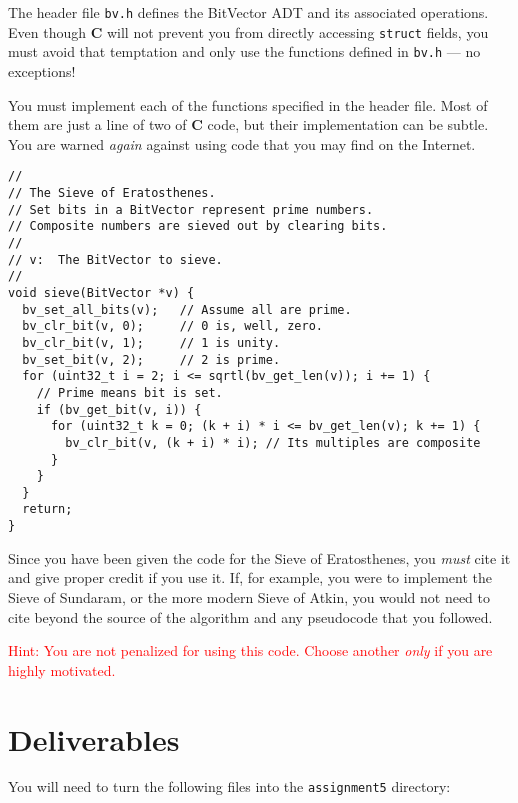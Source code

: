\documentclass{article}
\begin{document}
The header file \texttt{bv.h} defines the BitVector ADT and its associated
operations. Even though \textbf{C} will not prevent you from directly accessing
\texttt{struct} fields, you must avoid that temptation and only use the functions defined
in \texttt{bv.h} --- no exceptions!

You must implement each of the functions specified in the header
file. Most of them are just a line of two of \textbf{C} code, but
their implementation can be subtle. You are warned \emph{again}
against using code that you may find on the Internet.


\begin{lstlisting}
//
// The Sieve of Eratosthenes.
// Set bits in a BitVector represent prime numbers.
// Composite numbers are sieved out by clearing bits.
//
// v:  The BitVector to sieve.
//
void sieve(BitVector *v) {
  bv_set_all_bits(v);   // Assume all are prime.
  bv_clr_bit(v, 0);     // 0 is, well, zero.
  bv_clr_bit(v, 1);     // 1 is unity.
  bv_set_bit(v, 2);     // 2 is prime.
  for (uint32_t i = 2; i <= sqrtl(bv_get_len(v)); i += 1) {
    // Prime means bit is set.
    if (bv_get_bit(v, i)) {
      for (uint32_t k = 0; (k + i) * i <= bv_get_len(v); k += 1) {
        bv_clr_bit(v, (k + i) * i); // Its multiples are composite
      }
    }
  }
  return;
}
\end{lstlisting}

Since you have been given the code for the Sieve of Eratosthenes,
you \emph{must} cite it and give proper credit if you use it. If,
for example, you were to implement the Sieve of Sundaram, or the
more modern Sieve of Atkin, you would not need to cite beyond the
source of the algorithm and any pseudocode that you followed.

\textcolor{red}{Hint: You are not penalized for using this code. Choose another \emph{only} if you are highly motivated.}

\section{Deliverables}

You will need to turn the following files into the \texttt{assignment5} directory:
\end{document}
